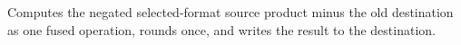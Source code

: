 Computes the negated selected-format source product minus the old destination as one fused operation, rounds once, and writes the result to the destination.
